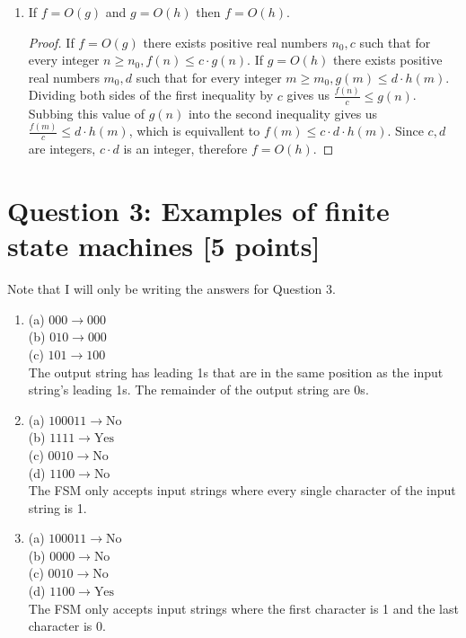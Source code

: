\documentclass{report}
\theoremstyle{mytheoremstyle}
\theoremstyle{mytheoremstyle}
\theoremstyle{myproblemstyle}
\begin{document}
\begin{enumerate}
\begin{proof}
        \end{proof}
    \item If $f=O(g)$ and $g=O(h)$ then $f=O(h)$.
        \begin{proof}
            If $f=O(g)$ there exists positive real numbers $n_0,c$ such that for every integer $n\geq n_0, f(n)\leq c\cdot g(n)$. If $g=O(h)$ there exists positive real numbers $m_0,d$ such that for every integer $m\geq m_0, g(m)\leq d\cdot h(m)$. Dividing both sides of the first inequality by $c$ gives us $\frac{f(n)}{c}\leq g(n)$. Subbing this value of $g(n)$ into the second inequality gives us $\frac{f(m)}{c}\leq d\cdot h(m)$, which is equivallent to $f(m)\leq c\cdot d\cdot h(m)$. Since $c,d$ are integers, $c\cdot d$ is an integer, therefore $f=O(h)$.
        \end{proof}
\end{enumerate}
\newpage
\section*{Question 3: Examples of finite state machines [5 points]}
Note that I will only be writing the answers for Question 3.
\begin{enumerate}
    \item
        (a) $000\rightarrow 000$\\
        (b) $010\rightarrow 000$\\
        (c) $101\rightarrow 100$\\
        The output string has leading 1s that are in the same position as the input string's leading 1s. The remainder of the output string are 0s.
    \item
        (a) $100011\rightarrow\text{No}$\\
        (b) $1111\rightarrow\text{Yes}$\\
        (c) $0010\rightarrow\text{No}$\\
        (d) $1100\rightarrow\text{No}$\\
        The FSM only accepts input strings where every single character of the input string is 1.
    \item
        (a) $100011\rightarrow\text{No}$\\
        (b) $0000\rightarrow\text{No}$\\
        (c) $0010\rightarrow\text{No}$\\
        (d) $1100\rightarrow\text{Yes}$\\
        The FSM only accepts input strings where the first character is 1 and the last character is 0.
\end{enumerate}
\newpage
\end{document}
